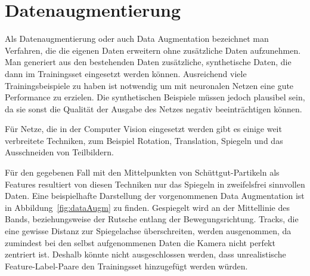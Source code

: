 


\section{Datenaugmentierung}




Als Datenaugmentierung oder auch Data Augmentation bezeichnet man Verfahren, die die eigenen Daten erweitern ohne zusätzliche Daten aufzunehmen.
Man generiert aus den bestehenden Daten zusätzliche, synthetische Daten, die dann im Trainingsset eingesetzt werden können.
Ausreichend viele Trainingsbeispiele zu haben ist notwendig um mit neuronalen Netzen eine gute Performance zu erzielen.
Die synthetischen Beispiele müssen jedoch plausibel sein, da sie sonst die Qualität der Ausgabe des Netzes negativ beeinträchtigen können.

Für Netze, die in der Computer Vision eingesetzt werden gibt es einige weit verbreitete Techniken,
zum Beispiel Rotation, Translation, Spiegeln und das Ausschneiden von Teilbildern.

Für den gegebenen Fall mit den Mittelpunkten von Schüttgut-Partikeln als Features resultiert von diesen Techniken nur das Spiegeln in zweifelsfrei sinnvollen Daten.
Eine beispielhafte Darstellung der vorgenommenen Data Augmentation ist in Abbildung~\ref{fig:dataAugm} zu finden.
Gespiegelt wird an der Mittellinie des Bands, beziehungsweise der Rutsche entlang der Bewegungsrichtung.
Tracks, die eine gewisse Distanz zur Spiegelachse überschreiten, werden ausgenommen, da zumindest bei den selbst aufgenommenen Daten 
die Kamera nicht perfekt zentriert ist.
Deshalb könnte nicht ausgeschlossen werden, 
dass unrealistische Feature-Label-Paare den Trainingsset hinzugefügt werden würden.

